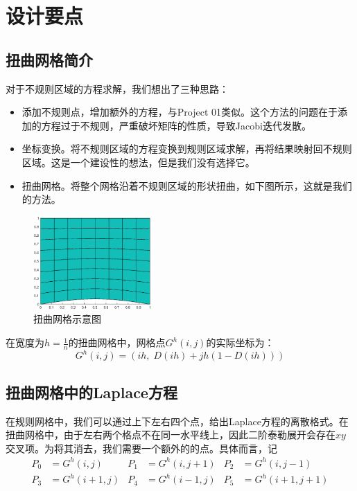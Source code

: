\documentclass[lang=cn,10pt]{elegantbook}
\begin{document}
\section{设计要点}

\subsection{扭曲网格简介}

对于不规则区域的方程求解，我们想出了三种思路：

\begin{itemize}
  \item 添加不规则点，增加额外的方程，与Project 01类似。这个方法的问题在于添加的方程过于不规则，严重破坏矩阵的性质，导致Jacobi迭代发散。
  \item 坐标变换。将不规则区域的方程变换到规则区域求解，再将结果映射回不规则区域。这是一个建设性的想法，但是我们没有选择它。
  \item 扭曲网格。将整个网格沿着不规则区域的形状扭曲，如下图所示，这就是我们的方法。
\end{itemize}

\begin{figure}[H]
  \centering
  \includegraphics[width=0.4\textwidth]{figure/3-1.eps}
  \caption{扭曲网格示意图}
\end{figure}

在宽度为$h=\frac{1}{n}$的扭曲网格中，网格点$G^h(i,j)$的实际坐标为：
\begin{equation*}
  G^h(i,j)=(ih,\;D(ih)+jh(1-D(ih)))
\end{equation*}

\subsection{扭曲网格中的Laplace方程}

在规则网格中，我们可以通过上下左右四个点，给出Laplace方程的离散格式。在扭曲网格中，由于左右两个格点不在同一水平线上，因此二阶泰勒展开会存在$xy$交叉项。为将其消去，我们需要一个额外的的点。具体而言，记
\begin{align*}
  P_0&=G^h(i,j) & P_1&=G^h(i,j+1) & P_2&=G^h(i,j-1)\\
  P_3&=G^h(i+1,j) & P_4&=G^h(i-1,j) & P_5&=G^h(i+1,j+1)
\end{align*}
\end{document}
